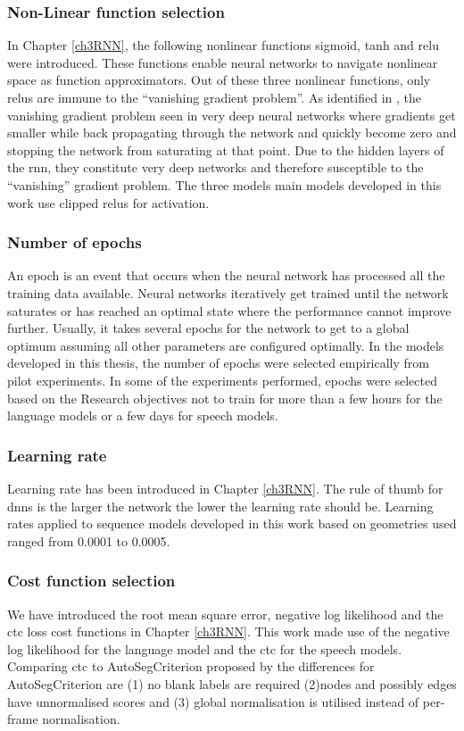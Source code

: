 \subsubsection{Non-Linear function selection}
In Chapter \ref{ch3RNN}, the following nonlinear functions sigmoid, tanh and \acrshort{relu} were introduced.  These functions enable neural networks to navigate nonlinear space as function approximators.  Out of these three nonlinear functions, only \acrshort{relu}s \citep{he2015delving} are immune to the “vanishing gradient problem”.  As identified in \cite{glorot2010understanding}, the vanishing gradient problem seen in very deep neural networks where gradients get smaller while back propagating through the network and quickly become zero and stopping the network from saturating at that point. Due to the hidden layers of the \acrshort{rnn}, they constitute very deep networks and therefore susceptible to the “vanishing” gradient problem.  The three models main models developed in this work use clipped \acrshort{relu}s for activation.
\subsubsection{Number of epochs}
An epoch is an event that occurs when the neural network has processed all the training data available.  Neural networks iteratively get trained until the network saturates or has reached an optimal state where the performance cannot improve further.  Usually, it takes several epochs for the network to get to a global optimum assuming all other parameters are configured optimally.  In the models developed in this thesis, the number of epochs were selected empirically from pilot experiments.  In some of the experiments performed, epochs were selected based on the Research objectives not to train for more than a few hours for the language models or a few days for speech models.
\subsubsection{Learning rate}
Learning rate has been introduced in Chapter \ref{ch3RNN}. The rule of thumb for \acrshort{dnn}s is the larger the network the lower the learning rate should be.  Learning rates applied to sequence models developed in this work based on geometries used ranged from 0.0001 to 0.0005.
\subsubsection{Cost function selection}
We have introduced the root mean square error, negative log likelihood and the \acrshort{ctc} loss cost functions in Chapter \ref{ch3RNN}.  This work made use of the negative log likelihood for the language model and the \acrshort{ctc} for the speech models. Comparing \acrshort{ctc} to AutoSegCriterion proposed by \citep{collobert2016wav2letter} the differences for AutoSegCriterion are (1) no blank labels are required (2)nodes and  possibly edges have unnormalised scores and (3) global normalisation is utilised instead of per-frame normalisation.
